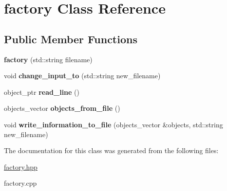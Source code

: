 \hypertarget{classfactory}{}\section{factory Class Reference}
\label{classfactory}
\subsection*{Public Member Functions}
\begin{DoxyCompactItemize}
\item 
{\bfseries factory} (std\+::string filename)\hypertarget{classfactory_af422815046ef8b9e95a4d8cb747fc43f}{}\label{classfactory_af422815046ef8b9e95a4d8cb747fc43f}

\item 
void {\bfseries change\+\_\+input\+\_\+to} (std\+::string new\+\_\+filename)\hypertarget{classfactory_a9e164a8fbb65188de99c39d55d7cc384}{}\label{classfactory_a9e164a8fbb65188de99c39d55d7cc384}

\item 
object\+\_\+ptr {\bfseries read\+\_\+line} ()\hypertarget{classfactory_a82385866bc910c1b3a3e82d56487dd24}{}\label{classfactory_a82385866bc910c1b3a3e82d56487dd24}

\item 
objects\+\_\+vector {\bfseries objects\+\_\+from\+\_\+file} ()\hypertarget{classfactory_afb2fad4ac9b0f39b1bfc3f3fc8d218b6}{}\label{classfactory_afb2fad4ac9b0f39b1bfc3f3fc8d218b6}

\item 
void {\bfseries write\+\_\+information\+\_\+to\+\_\+file} (objects\+\_\+vector \&objects, std\+::string new\+\_\+filename)\hypertarget{classfactory_af17f2a44d75cf8ccf712384341c2fcde}{}\label{classfactory_af17f2a44d75cf8ccf712384341c2fcde}

\end{DoxyCompactItemize}


The documentation for this class was generated from the following files\+:\begin{DoxyCompactItemize}
\item 
\hyperlink{factory_8hpp}{factory.\+hpp}\item 
factory.\+cpp\end{DoxyCompactItemize}
